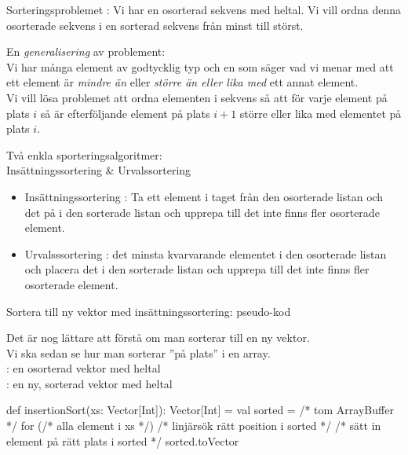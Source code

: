 



\begin{Slide}{Sorteringsproblemet}
: Vi har en osorterad sekvens med heltal. Vi vill ordna denna osorterade sekvens i en sorterad sekvens från minst till störst.
\pause

\vspace{2em}
En \emph{generalisering} av problement: \\ \vspace{1em} Vi har många element av godtycklig typ och en  som säger vad vi menar med att ett element är \emph{mindre än} eller \emph{större än eller lika med} ett annat element. \\ \vspace{1em}
Vi vill lösa problemet att ordna elementen i sekvens så att för varje element på plats $i$ så är efterföljande element på plats $i + 1$ större eller lika med elementet på plats $i$.

\end{Slide} 

\begin{Slide}{Två enkla sporteringsalgoritmer: \\ Insättningssortering \& Urvalssortering}
\begin{itemize}
\item Insättningssortering : Ta ett element i taget från den osorterade listan och  det på  i den sorterade listan och upprepa till det inte finns fler osorterade element. 
\pause
\item Urvalsssortering :  det minsta kvarvarande elementet i den osorterade listan och placera det  i den sorterade listan och upprepa till det inte finns fler osorterade element. 
\end{itemize}
\end{Slide} 


\begin{Slide}{Sortera till ny vektor med insättningssortering: pseudo-kod}

{\SlideFontSmall Det är nog lättare att förstå  om man sorterar till en ny vektor. \\ Vi ska sedan se hur man sorterar ''på plats''  i en  array.\\} \vspace{1em}
: en osorterad vektor med heltal \\
: en ny, sorterad vektor med heltal
\begin{Code}
def insertionSort(xs: Vector[Int]): Vector[Int] = {
  val sorted = /* tom ArrayBuffer */
  for (/* alla element i xs */) {
     /* linjärsök rätt position i sorted */
     /* sätt in element på rätt plats i sorted */ 
  }
  sorted.toVector
}
\end{Code}
\end{Slide}

